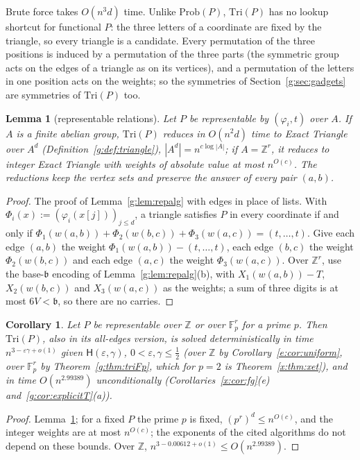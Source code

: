 \documentclass[11pt]{article}
\newtheorem{lemma}[theorem]{Lemma}
\newtheorem{corollary}[theorem]{Corollary}
\theoremstyle{definition}
\theoremstyle{remark}
\newcommand{\Z}{\mathbb{Z}}
\newcommand{\Fp}{\mathbb{F}_p}
\newcommand{\Prob}{\mathrm{Prob}}
\newcommand{\eps}{\varepsilon}
\newcommand{\Hyp}{\mathsf{H}}
\newcommand{\EpsGammaBest}{0.00612}%
\newcommand{\ExpTriBestUp}{2.99389}%
\begin{document}
Brute force takes $O(n^3d)$ time. Unlike $\Prob(P)$, $\mathrm{Tri}(P)$ has no lookup shortcut for functional $P$: the three letters of a coordinate are fixed by the triangle, so every triangle is a candidate. Every permutation of the three positions is induced by a permutation of the three parts (the symmetric group acts on the edges of a triangle as on its vertices), and a permutation of the letters in one position acts on the weights; so the symmetries of Section~\ref{g:sec:gadgets} are symmetries of $\mathrm{Tri}(P)$ too.

\begin{lemma}[representable relations]\label{g:lem:trirep}
Let $P$ be representable by $(\varphi_i,t)$ over $A$. If $A$ is a finite abelian group, $\mathrm{Tri}(P)$ reduces in $O(n^2d)$ time to Exact Triangle over $A^d$ (Definition~\ref{g:def:triangle}), $|A^d|=n^{c\log|A|}$; if $A=\Z^r$, it reduces to integer Exact Triangle with weights of absolute value at most $n^{O(c)}$. The reductions keep the vertex sets and preserve the answer of every pair $(a,b)$.
\end{lemma}

\begin{proof}
The proof of Lemma~\ref{g:lem:repalg} with edges in place of lists. With $\Phi_i(x):=(\varphi_i(x[j]))_{j\le d}$, a triangle satisfies $P$ in every coordinate if and only if $\Phi_1(w(a,b))+\Phi_2(w(b,c))+\Phi_3(w(a,c))=(t,\dots,t)$. Give each edge $(a,b)$ the weight $\Phi_1(w(a,b))-(t,\dots,t)$, each edge $(b,c)$ the weight $\Phi_2(w(b,c))$ and each edge $(a,c)$ the weight $\Phi_3(w(a,c))$. Over $\Z^r$, use the base-$\mathfrak b$ encoding of Lemma~\ref{g:lem:repalg}(b), with $X_1(w(a,b))-T$, $X_2(w(b,c))$ and $X_3(w(a,c))$ as the weights; a sum of three digits is at most $6V<\mathfrak b$, so there are no carries.
\end{proof}

\begin{corollary}\label{g:cor:trirepfast}
Let $P$ be representable over $\Z$ or over $\Fp^r$ for a prime $p$. Then $\mathrm{Tri}(P)$, also in its all-edges version, is solved deterministically in time $n^{3-\eps\gamma+o(1)}$ given $\Hyp(\eps,\gamma)$, $0<\eps,\gamma\le\frac12$ (over $\Z$ by Corollary~\ref{e:cor:uniform}, over $\Fp^r$ by Theorem~\ref{g:thm:triFp}, which for $p=2$ is Theorem~\ref{x:thm:xet}), and in time $O(n^{\ExpTriBestUp})$ unconditionally (Corollaries~\ref{x:cor:fg}(e) and~\ref{g:cor:explicitT}(a)).
\end{corollary}
\begin{proof}
Lemma~\ref{g:lem:trirep}; for a fixed $P$ the prime $p$ is fixed, $(p^r)^d\le n^{O(c)}$, and the integer weights are at most $n^{O(c)}$; the exponents of the cited algorithms do not depend on these bounds. Over $\Z$, $n^{3-\EpsGammaBest+o(1)}\le O(n^{\ExpTriBestUp})$.
\end{proof}
\end{document}
